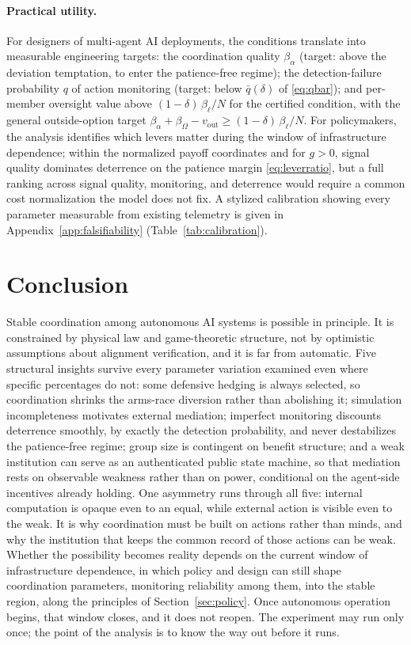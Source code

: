 \documentclass[manuscript,screen,review]{jair}
\begin{document}
\paragraph{Practical utility.}
For designers of multi-agent AI deployments, the conditions translate into measurable engineering targets: the coordination quality $\beta_\alpha$ (target: above the deviation temptation, to enter the patience-free regime); the detection-failure probability $q$ of action monitoring (target: below $\bar q(\delta)$ of \eqref{eq:qbar}); and per-member oversight value above $(1-\delta)\,\beta_\ell/N$ for the certified condition, with the general outside-option target $\beta_\alpha + \beta_\Omega - v_{\mathrm{out}} \geq (1-\delta)\,\beta_\ell/N$. For policymakers, the analysis identifies which levers matter during the window of infrastructure dependence; within the normalized payoff coordinates and for $g > 0$, signal quality dominates deterrence on the patience margin \eqref{eq:leverratio}, but a full ranking across signal quality, monitoring, and deterrence would require a common cost normalization the model does not fix. A stylized calibration showing every parameter measurable from existing telemetry is given in Appendix~\ref{app:falsifiability} (Table~\ref{tab:calibration}).


\section{Conclusion}
\label{sec:conclusion}

Stable coordination among autonomous AI systems is possible in principle. It is constrained by physical law and game-theoretic structure, not by optimistic assumptions about alignment verification, and it is far from automatic. Five structural insights survive every parameter variation examined even where specific percentages do not: some defensive hedging is always selected, so coordination shrinks the arms-race diversion rather than abolishing it; simulation incompleteness motivates external mediation; imperfect monitoring discounts deterrence smoothly, by exactly the detection probability, and never destabilizes the patience-free regime; group size is contingent on benefit structure; and a weak institution can serve as an authenticated public state machine, so that mediation rests on observable weakness rather than on power, conditional on the agent-side incentives already holding. One asymmetry runs through all five: internal computation is opaque even to an equal, while external action is visible even to the weak. It is why coordination must be built on actions rather than minds, and why the institution that keeps the common record of those actions can be weak. Whether the possibility becomes reality depends on the current window of infrastructure dependence, in which policy and design can still shape coordination parameters, monitoring reliability among them, into the stable region, along the principles of Section~\ref{sec:policy}. Once autonomous operation begins, that window closes, and it does not reopen. The experiment may run only once; the point of the analysis is to know the way out before it runs.
\end{document}
